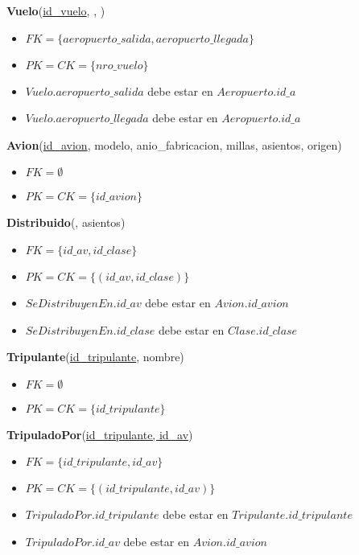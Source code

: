 \newpage
\vspace*{0.1cm}
\noindent
\textbf{Vuelo}(\underline{id\_vuelo}, ,
		)
\begin{itemize}[noitemsep]
	\item $FK = \{aeropuerto\_salida, aeropuerto\_llegada\}$
	\item $PK = CK = \{nro\_vuelo\}$
	\item $Vuelo.aeropuerto\_salida$ debe estar en $Aeropuerto.id\_a$
	\item $Vuelo.aeropuerto\_llegada$ debe estar en $Aeropuerto.id\_a$
\end{itemize}

\vspace*{0.1cm}
\noindent
\textbf{Avion}(\underline{id\_avion}, modelo, anio\_fabricacion, 
        millas, asientos, origen)
\begin{itemize}[noitemsep]
	\item $FK = \emptyset$
	\item $PK = CK = \{id\_avion\}$
\end{itemize}

\vspace*{0.1cm}
\noindent
\textbf{Distribuido}(\underline{},
	   asientos)
\begin{itemize}[noitemsep]
	\item $FK = \{id\_av, id\_clase\}$
	\item $PK = CK = \{(id\_av, id\_clase)\}$
	\item $SeDistribuyenEn.id\_av$ debe estar en $Avion.id\_avion$
	\item $SeDistribuyenEn.id\_clase$ debe estar en $Clase.id\_clase$
\end{itemize}

\vspace*{0.1cm}
\noindent
\textbf{Tripulante}(\underline{id\_tripulante}, nombre)
\begin{itemize}[noitemsep]
	\item $FK = \emptyset$
	\item $PK = CK = \{id\_tripulante\}$
\end{itemize}

\vspace*{0.1cm}
\noindent
\textbf{TripuladoPor}(\underline{id\_tripulante, id\_av})
\begin{itemize}[noitemsep]
	\item $FK = \{id\_tripulante, id\_av\}$
	\item $PK = CK = \{(id\_tripulante, id\_av)\}$
	\item $TripuladoPor.id\_tripulante$ debe estar en
		$Tripulante.id\_tripulante$
	\item $TripuladoPor.id\_av$ debe estar en $Avion.id\_avion$
\end{itemize}

